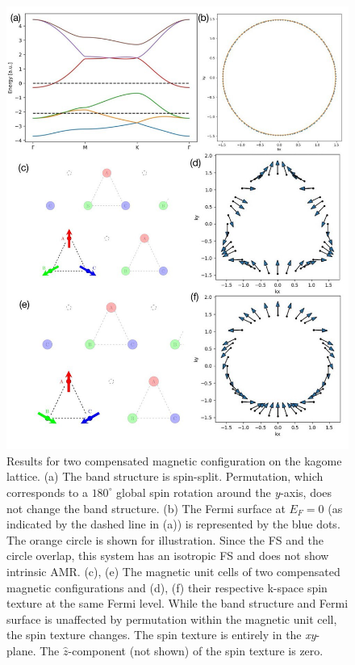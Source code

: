 \documentclass[prb,showpacs,amsmath,amssymb,superscriptaddress,twocolumn,floatfix]{revtex4-1}
\begin{document}
\begin{figure}
	\centering
	\includegraphics[width=1\linewidth]{img/overview_Kagome_phase1a}
	\caption{Results for two compensated magnetic configuration on the kagome lattice. (a) The band structure is spin-split. Permutation, {\color{blue} which corresponds to a $180^\circ$ global spin rotation around the \textit{y}-axis,} does not change the band structure. (b) The Fermi surface at $E_F = 0$ (as indicated by the dashed line in (a)) is represented by the blue dots. The orange circle is shown for illustration. Since the FS and the circle overlap, this system has an isotropic FS and does not show intrinsic AMR. (c), (e) The magnetic unit cells of two compensated magnetic configurations and (d), (f) their respective k-space spin texture at the same Fermi level. While the band structure and Fermi surface is unaffected by permutation within the magnetic unit cell, the spin texture changes. The spin texture is entirely in the \textit{xy}-plane. The $\hat{z}$-component (not shown) of the spin texture is zero.}
	\label{fig:totalkagomephase1a}
\end{figure}
\end{document}
